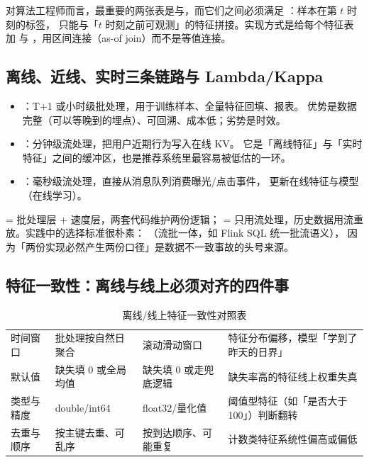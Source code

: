 对算法工程师而言，最重要的两张表是与，而它们之间必须满足
：样本在第 $t$ 时刻的标签，
只能与「$t$ 时刻之前可观测」的特征拼接。实现方式是给每个特征表加
 与 ，用区间连接（as-of join）而不是等值连接。

\subsection{离线、近线、实时三条链路与 Lambda/Kappa}

\begin{itemize}
  \item {}：T+1 或小时级批处理，用于训练样本、全量特征回填、报表。
        优势是数据完整（可以等晚到的埋点）、可回溯、成本低；劣势是时效。
  \item {}：分钟级流处理，把用户近期行为写入在线 KV。
        它是「离线特征」与「实时特征」之间的缓冲区，也是推荐系统里最容易被低估的一环。
  \item {}：毫秒级流处理，直接从消息队列消费曝光/点击事件，
        更新在线特征与模型（在线学习）。
\end{itemize}

 = 批处理层 + 速度层，两套代码维护两份逻辑；
 = 只用流处理，历史数据用流重放。实践中的选择标准很朴素：
（流批一体，如 Flink SQL 统一批流语义），
因为「两份实现必然产生两份口径」是数据不一致事故的头号来源。

\subsection{特征一致性：离线与线上必须对齐的四件事}

\begin{table}[htbp]
\centering
\caption{离线/线上特征一致性对照表}
\label{tab:consistency}
\small
\begin{tabularx}{\textwidth}{L{2.2cm} L{3.4cm} L{3.4cm} Y}
\toprule
{} &  &  &  \\
\midrule
时间窗口 & 批处理按自然日聚合 & 滚动滑动窗口 & 特征分布偏移，模型「学到了昨天的日界」 \\
\addlinespace
默认值 & 缺失填 0 或全局均值 & 缺失填 0 或走兜底逻辑 & 缺失率高的特征线上权重失真 \\
\addlinespace
类型与精度 & double/int64 & float32/量化值 & 阈值型特征（如「是否大于 100」）判断翻转 \\
\addlinespace
去重与顺序 & 按主键去重、可乱序 & 按到达顺序、可能重复 & 计数类特征系统性偏高或偏低 \\
\bottomrule
\end{tabularx}
\end{table}

